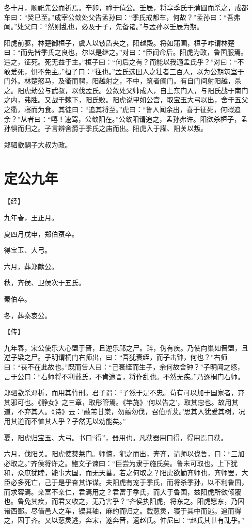 \documentclass[a4paper,12pt,UTF8,twoside]{ctexbook}
\begin{document}
冬十月，顺祀先公而祈焉。辛卯，禘于僖公。壬辰，将享季氏于蒲圃而杀之，戒都车曰：“癸巳至。”成宰公敛处父告孟孙曰：“季氏戒都车，何故？”孟孙曰：“吾弗闻。”处父曰：“然则乱也，必及于子，先备诸。”与孟孙以壬辰为期。

阳虎前驱，林楚御桓子，虞人以铍盾夹之，阳越殿。将如蒲圃，桓子咋谓林楚曰：“而先皆季氏之良也，尔以是继之。”对曰：“臣闻命后。阳虎为政，鲁国服焉。违之，征死。死无益于主。”桓子曰：“何后之有？而能以我適孟氏乎？”对曰：“不敢爱死，惧不免主。”桓子曰：“往也。”孟氏选圉人之壮者三百人，以为公期筑室于门外。林楚怒马，及衢而骋，阳越射之，不中，筑者阖门。有自门间射阳越，杀之。阳虎劫公与武叔，以伐孟氏。公敛处父帅成人，自上东门入，与阳氏战于南门之内，弗胜。又战于棘下，阳氏败。阳虎说甲如公宫，取宝玉大弓以出，舍于五父之衢，寝而为食。其徒曰：“追其将至。”虎曰：“鲁人闻余出，喜于征死，何暇追余？”从者曰：“嘻！速驾，公敛阳在。”公敛阳请追之，孟孙弗许。阳欲杀桓子，孟孙惧而归之。子言辨舍爵于季氏之庙而出。阳虎入于讙、阳关以叛。

郑驷歂嗣子大叔为政。


\chapter{定公九年}


【经】

九年春，王正月。

夏四月戊申，郑伯虿卒。

得宝玉、大弓。

六月，葬郑献公。

秋，齐侯、卫侯次于五氏。

秦伯卒。

冬，葬秦哀公。

【传】

九年春，宋公使乐大心盟于晋，且逆乐祁之尸。辞，伪有疾。乃使向巢如晋盟，且逆子梁之尸。子明谓桐门右师出，曰：“吾犹衰绖，而子击钟，何也？”右师曰：“丧不在此故也。”既而告人曰：“己衰绖而生子，余何故舍钟？”子明闻之怒，言于公曰：“右师将不利戴氏，不肯適晋，将作乱也。不然无疾。”乃逐桐门右师。

郑驷歂杀邓析，而用其竹刑。君子谓：“子然于是不忠。苟有可以加于国家者，弃其邪可也。《静女》之三章，取彤管焉。《竿旄》‘何以告之’，取其忠也。故用其道，不弃其人。《诗》云：‘蔽芾甘棠，勿翦勿伐，召伯所茇。’思其人犹爱其树，况用其道而不恤其人乎？子然无以劝能矣。”

夏，阳虎归宝玉、大弓。书曰“得”，器用也。凡获器用曰得，得用焉曰获。

六月，伐阳关。阳虎使焚莱门。师惊，犯之而出，奔齐，请师以伐鲁，曰：“三加必取之。”齐侯将许之。鲍文子谏曰：“臣尝为隶于施氏矣。鲁未可取也。上下犹和，众庶犹睦，能事大国，而无天菑。若之何取之？阳虎欲勤齐师也，齐师罢，大臣必多死亡，己于是乎奋其诈谋。夫阳虎有宠于季氏，而将杀季孙，以不利鲁国，而求容焉。亲富不亲仁，君焉用之？君富于季氏，而大于鲁国，兹阳虎所欲倾覆也。鲁免其疾，而君又收之，无乃害乎？”齐侯执阳虎，将东之。阳虎愿东，乃囚诸西鄙。尽借邑人之车，锲其轴，麻约而归之。载葱灵，寝于其中而逃。追而得之，囚于齐。又以葱灵逃，奔宋，遂奔晋，適赵氏。仲尼曰：“赵氏其世有乱乎。”
\end{document}
